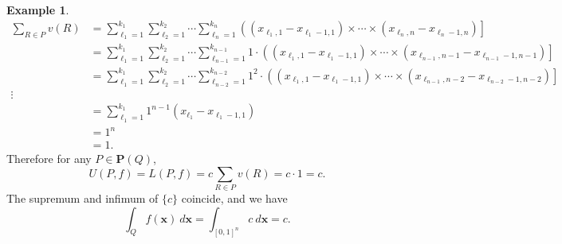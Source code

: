 \documentclass{article}
\newcommand{\x}{\mathbf{x}}
\newcommand{\brk}[1]{ \left(#1\right] }
\newcommand{\paren}[1]{ \left(#1\right) }
\theoremstyle{definition}
\newtheorem{example}{Example}[section]
\begin{document}
\begin{example}
\begin{align*}
	\sum_{R\in P} v(R) &= \sum_{\ell _1 = 1}^{k_1}\sum_{\ell _2 = 1}^{k_2}\cdots \sum_{\ell _n = 1}^{k_n}\brk{\paren{x_{\ell_1,1} - x_{\ell_1-1,1}}\times \cdots \times \paren{x_{\ell_n,n} - x_{\ell_n-1,n}}}\\ 
	& = \sum_{\ell _1 = 1}^{k_1}\sum_{\ell _2 = 1}^{k_2}\cdots \sum_{\ell _{n-1} = 1}^{k_{n-1}}1\cdot \brk{\paren{x_{\ell_1,1} - x_{\ell_1-1,1}}\times \cdots \times \paren{x_{\ell_{n-1},{n-1}} - x_{\ell_{n-1}-1,{n-1}}}}\\ 
	& = \sum_{\ell _1 = 1}^{k_1}\sum_{\ell _2 = 1}^{k_2}\cdots \sum_{\ell _{n-2} = 1}^{k_{n-2}}1^2\cdot \brk{\paren{x_{\ell_1,1} - x_{\ell_1-1,1}}\times \cdots \times \paren{x_{\ell_{n-1},{n-2}} - x_{\ell_{n-2}-1,{n-2}}}}\\ 
	\vdots &\\
	& = \sum_{\ell _1 = 1}^{k_1}1^{n-1}	\paren{x_{\ell_1} - x_{\ell_1 -1,1}}\\ 
	& = 1^n\\
	& = 1.
\end{align*}
Therefore for any $ P\in \mathbf P (Q) $, $$ U(P,f)=L(P,f) = c\sum_{R\in P} v(R)= c\cdot 1 = c .$$
The supremum and infimum of $ \{c\}  $ coincide, and we have $$ \int_Q f(\x) \ d\x = \int_{[0,1]^n}c\ d\x = c.$$
\end{example}
\end{document}
